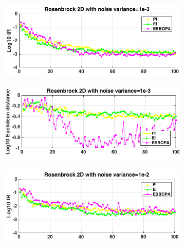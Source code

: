 \documentclass[a4paper,11pt]{report}
\begin{document}
\begin{figure} [H]
\label{RosenbrocknoisyIRandL2}
	\begin{subfigure}{.5\textwidth}
		  \centering
		  \includegraphics[width=1\linewidth]{Rosenbrock1e-3_ESBOPAV4_IR.png}
	\end{subfigure}
	\begin{subfigure}{.5\textwidth}
 		 \centering
 		 \includegraphics[width=1\linewidth]{Rosenbrock1e-3_ESBOPAV4_Xnorm.png}
	\end{subfigure}	
	\begin{subfigure}{.5\textwidth}
		  \centering
		  \includegraphics[width=1\linewidth]{Rosenbrock1e-2_ESBOPAV4_IR.png}
	\end{subfigure}
	\begin{subfigure}{.5\textwidth}

\end{subfigure}
\end{figure}
\end{document}
